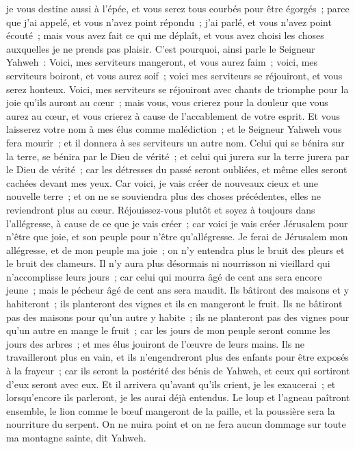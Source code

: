 \begin{multicols}{2}
je vous destine aussi à l'épée, et vous serez tous courbés pour être égorgés~; parce que j'ai appelé, et vous n'avez point répondu~; j'ai parlé, et vous n'avez point écouté~; mais vous avez fait ce qui me déplaît, et vous avez choisi les choses auxquelles je ne prends pas plaisir.
C'est pourquoi, ainsi parle le Seigneur Yahweh~: Voici, mes serviteurs mangeront, et vous aurez faim~; voici, mes serviteurs boiront, et vous aurez soif~; voici mes serviteurs se réjouiront, et vous serez honteux.
Voici, mes serviteurs se réjouiront avec chants de triomphe pour la joie qu'ils auront au cœur~; mais vous, vous crierez pour la douleur que vous aurez au cœur, et vous crierez à cause de l'accablement de votre esprit.
Et vous laisserez votre nom à mes élus comme malédiction~; et le Seigneur Yahweh vous fera mourir~; et il donnera à ses serviteurs un autre nom.
Celui qui se bénira sur la terre, se bénira par le Dieu de vérité~; et celui qui jurera sur la terre jurera par le Dieu de vérité~; car les détresses du passé seront oubliées, et même elles seront cachées devant mes yeux.
Car voici, je vais créer de nouveaux cieux et une nouvelle terre~; et on ne se souviendra plus des choses précédentes, elles ne reviendront plus au cœur.
Réjouissez-vous plutôt et soyez à toujours dans l'allégresse, à cause de ce que je vais créer~; car voici je vais créer Jérusalem pour n'être que joie, et son peuple pour n'être qu'allégresse.
Je ferai de Jérusalem mon allégresse, et de mon peuple ma joie~; on n'y entendra plus le bruit des pleurs et le bruit des clameurs.
Il n'y aura plus désormais ni nourrisson ni vieillard qui n'accomplisse leurs jours~; car celui qui mourra âgé de cent ans sera encore jeune~; mais le pécheur âgé de cent ans sera maudit.
Ils bâtiront des maisons et y habiteront~; ils planteront des vignes et ils en mangeront le fruit.
Ils ne bâtiront pas des maisons pour qu'un autre y habite~; ils ne planteront pas des vignes pour qu'un autre en mange le fruit~; car les jours de mon peuple seront comme les jours des arbres~; et mes élus jouiront de l'œuvre de leurs mains.
Ils ne travailleront plus en vain, et ils n'engendreront plus des enfants pour être exposés à la frayeur~; car ils seront la postérité des bénis de Yahweh, et ceux qui sortiront d'eux seront avec eux.
Et il arrivera qu'avant qu'ils crient, je les exaucerai~; et lorsqu'encore ils parleront, je les aurai déjà entendus.
Le loup et l'agneau paîtront ensemble, le lion comme le bœuf mangeront de la paille, et la poussière sera la nourriture du serpent. On ne nuira point et on ne fera aucun dommage sur toute ma montagne sainte, dit Yahweh.

\end{multicols}
